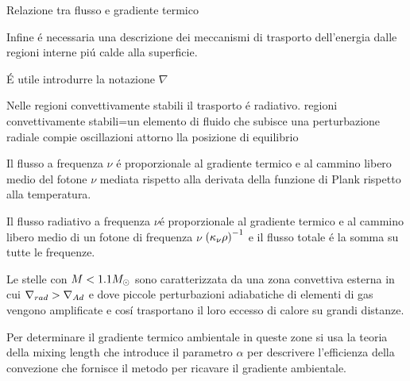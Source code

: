 \documentclass[10pt,xcolor={usenames},fleqn,mathserif,serif]{beamer}
\begin{document}
\begin{wordonframe}{Relazione tra flusso e gradiente termico}

Infine \'e necessaria una descrizione dei meccanismi di trasporto dell'energia dalle regioni interne pi\'u calde alla superficie.

\'E utile introdurre la notazione $\nabla$

Nelle regioni convettivamente stabili il trasporto \'e radiativo.
{\small regioni convettivamente stabili=un elemento di fluido che subisce una perturbazione radiale compie oscillazioni attorno lla posizione di equilibrio}

Il flusso a frequenza $\nu$ \'e proporzionale al gradiente termico e al cammino libero medio del fotone $\nu$ mediata rispetto alla derivata della funzione di Plank rispetto alla temperatura.

Il flusso radiativo a frequenza $\nu$\'e proporzionale al gradiente termico e al cammino libero medio di un fotone di frequenza $\nu$ ${(\kappa_{\nu}\rho)}^{-1}$ e il flusso totale \'e la somma su tutte le frequenze.

Le stelle con $M<1.1M_{\odot}{}$ sono caratterizzata da una zona convettiva esterna in cui $\nabla_{rad}{}>\nabla_{Ad}{}$ e dove piccole perturbazioni adiabatiche di elementi di gas vengono amplificate e cos\'i trasportano il loro eccesso di calore su grandi distanze.

Per determinare il gradiente termico ambientale in queste zone si usa la teoria della mixing length che introduce il parametro $\alpha$ per descrivere l'efficienza della convezione che fornisce il metodo per ricavare il gradiente ambientale.


\end{wordonframe}


\end{document}

